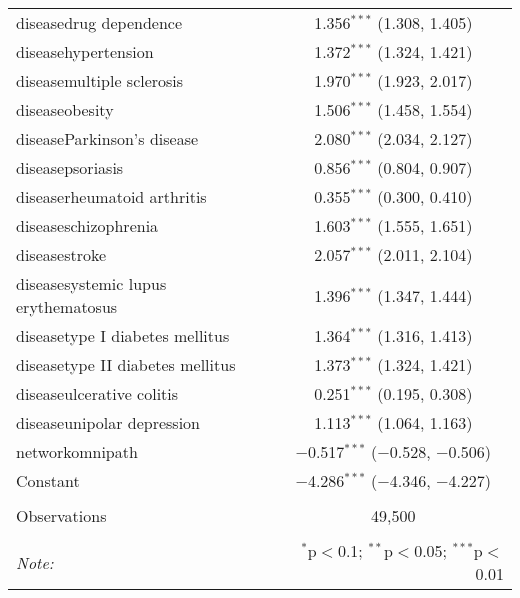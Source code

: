 \begin{table}[!htbp]
\begin{tabular}{@{\extracolsep{5pt}}lc}
  diseasedrug dependence & 1.356$^{***}$ (1.308, 1.405) \\ 
  diseasehypertension & 1.372$^{***}$ (1.324, 1.421) \\ 
  diseasemultiple sclerosis & 1.970$^{***}$ (1.923, 2.017) \\ 
  diseaseobesity & 1.506$^{***}$ (1.458, 1.554) \\ 
  diseaseParkinson's disease & 2.080$^{***}$ (2.034, 2.127) \\ 
  diseasepsoriasis & 0.856$^{***}$ (0.804, 0.907) \\ 
  diseaserheumatoid arthritis & 0.355$^{***}$ (0.300, 0.410) \\ 
  diseaseschizophrenia & 1.603$^{***}$ (1.555, 1.651) \\ 
  diseasestroke & 2.057$^{***}$ (2.011, 2.104) \\ 
  diseasesystemic lupus erythematosus & 1.396$^{***}$ (1.347, 1.444) \\ 
  diseasetype I diabetes mellitus & 1.364$^{***}$ (1.316, 1.413) \\ 
  diseasetype II diabetes mellitus & 1.373$^{***}$ (1.324, 1.421) \\ 
  diseaseulcerative colitis & 0.251$^{***}$ (0.195, 0.308) \\ 
  diseaseunipolar depression & 1.113$^{***}$ (1.064, 1.163) \\ 
  networkomnipath & $-$0.517$^{***}$ ($-$0.528, $-$0.506) \\ 
  Constant & $-$4.286$^{***}$ ($-$4.346, $-$4.227) \\ 
 \hline \\[-1.8ex] 
Observations & 49,500 \\ 
\hline 
\hline \\[-1.8ex] 
\textit{Note:}  & \multicolumn{1}{r}{$^{*}$p$<$0.1; $^{**}$p$<$0.05; $^{***}$p$<$0.01} \\ 
\end{tabular} 
\end{table} 
